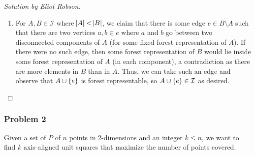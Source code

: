 \documentclass{article}
\newenvironment{solution}[1]{\begin{proof}[Solution by #1]}{\end{proof}}
\begin{document}
\begin{enumerate}
\begin{solution}{Eliot Robson}
\begin{enumerate}
			\item For \(A, B \in \mathcal{I}\) where \(\abs{A} < \abs{B}\), we claim that there is some edge \(e \in B \setminus A\) such that there are two vertices \(a,b \in e\) where \(a\) and \(b\) go between two disconnected components of \(A\) (for some fixed forest representation of \(A\)). If there were no such edge, then some forest representation of \(B\) would lie inside some forest representation of \(A\) (in each component), a contradiction as there are more elements in \(B\) than in \(A\). Thus, we can take such an edge and observe that \(A \cup \set{e}\) is forest representable, so \(A \cup \set{e} \in \mathcal{I}\) as desired. \qedhere
		\end{enumerate}
	\end{solution}
	
\end{enumerate}

\subsubsection{Problem 2}
Given a set of \(P\) of \(n\) points in 2-dimensions and an integer \(k \leq n\), we want to find \(k\) axis-aligned unit squares that maximize the number of points covered.
\end{document}
